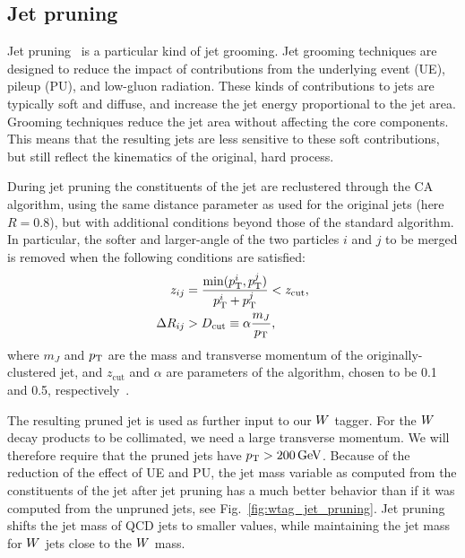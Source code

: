 



\subsection{Jet pruning}

Jet pruning~\cite{Ellis:2009su,Ellis:2009me} is a particular kind of jet grooming. Jet grooming
techniques are designed to reduce the impact of contributions from the underlying event (UE), pileup
(PU), and low-\pt gluon radiation. These kinds of contributions to jets are typically soft and
diffuse, and increase the jet energy proportional to the jet area. Grooming techniques reduce the
jet area without affecting the core components. This means that the resulting jets are less
sensitive to these soft contributions, but still reflect the kinematics of the original, hard
process.


During jet pruning the constituents of the jet are reclustered through the CA algorithm, using the
same distance parameter as used for the original jets (here $R=0.8$), but with additional conditions
beyond those of the standard algorithm.
In particular, the softer and larger-angle of the two particles $i$ and $j$ to be merged is removed
when the following conditions are satisfied:
\begin{align}
  z_{ij} &= \frac{\min( p_{\mathrm{T}}^i , p_{\mathrm{T}}^j )}{p_{\mathrm{T}}^i + p_{\mathrm{T}}^j} < z_{\textrm{cut}}, \\
  \Delta R_{ij} &> D_{\textrm{cut}} \equiv \alpha \frac{m_J}{p_{\mathrm{T}}} ,
\end{align}
where $m_J$ and $p_{\mathrm{T}}$ are the mass and transverse momentum of the originally-clustered jet, and
$z_\textrm{cut}$ and $\alpha$ are parameters of the algorithm, chosen to be 0.1 and 0.5,
respectively~\cite{Chatrchyan:2013vbb}. 

The resulting pruned jet is used as further input to our $W$ tagger. For the $W$ decay products
to be collimated, we need a large transverse momentum. We will therefore require that the pruned
jets have $p_{\mathrm{T}} > 200\,\text{Ge\hspace{-.08em}V}$. 
Because of the reduction of the effect of UE and PU, the jet mass variable as computed from the
constituents of the jet after jet pruning has a much better behavior than if it was computed from
the unpruned jets, see Fig.~\ref{fig:wtag_jet_pruning}. Jet pruning shifts the jet mass of QCD jets
to smaller values, while maintaining the jet mass for $W$ jets close to the $W$ mass.

